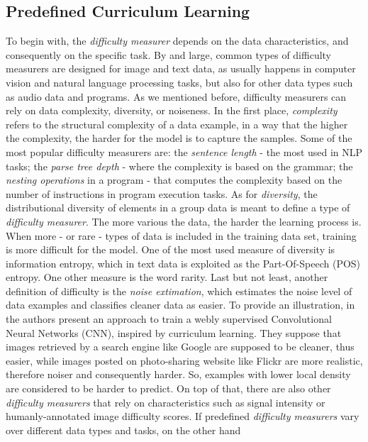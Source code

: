 \subsection{Predefined Curriculum Learning}
\label{subsection:predCL}
To begin with, the \textit{difficulty measurer} depends on the data characteristics, and consequently
on the specific task. 
By and large, common types of difficulty measurers are designed for image and text data, as usually happens in computer vision and natural language processing tasks, 
but also for other data types such as audio data and programs. 
As we mentioned before, difficulty measurers can rely on data complexity, diversity, or noiseness.
In the first place, \textit{complexity} refers to the structural complexity of a data example, in a way that the higher the complexity, 
the harder for the model is to capture the samples. 
Some of the most popular difficulty measurers are: the \textit{sentence length} - the most used in NLP tasks;
the \textit{parse tree depth} - where the complexity is based on the grammar; the \textit{nesting operations} in a program - that computes the complexity based on the number of instructions in
program execution tasks. 
As for \textit{diversity}, the distributional diversity of elements in a group data is meant to define a type of \textit{difficulty measurer}.
The more various the data, the harder the learning process is.
When more - or rare - types of data is included in the training data set, training is more difficult for the model. 
One of the most used measure of diversity is information entropy, which in text data is exploited as the Part-Of-Speech (POS) entropy. One other measure is the word rarity.
Last but not least, another definition of difficulty is the \textit{noise extimation}, which estimates
the noise level of data examples and classifies cleaner data as easier. To provide an illustration, in \cite{chen2015webly}
the authors present an approach to train a webly supervised Convolutional Neural Networks (CNN), inspired by curriculum learning.
They suppose that images retrieved by a search engine like Google are supposed to be cleaner, thus easier, while images
posted on photo-sharing website like Flickr are more realistic, therefore noiser and consequently harder. 
So, examples with lower local density are considered to be harder to predict. 
On top of that, there are also other \textit{difficulty measurers} that rely on 
characteristics such as signal intensity or humanly-annotated image difficulty scores.
\newline
If predefined \textit{difficulty measurers} vary over different data types and tasks, on the other hand

